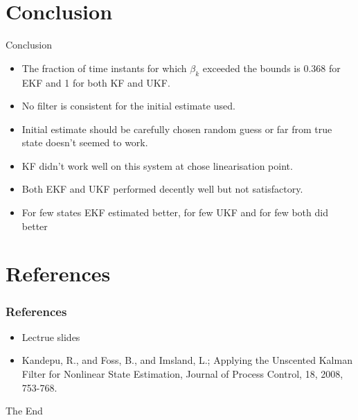 \documentclass{beamer}
\begin{document}
\section{Conclusion}
\begin{frame}{Conclusion}
    \begin{itemize}
        \item The fraction of time instants for which $\beta_k$ exceeded the bounds is 0.368 for EKF and 1 for both KF and UKF.
        \item No filter is consistent for the initial estimate used.
        \item Initial estimate should be carefully chosen random guess or far from true state doesn't seemed to work. 
        \item KF didn't work well on this system at chose linearisation point.
        \item Both EKF and UKF performed decently well but not satisfactory.
        \item For few states EKF estimated better, for few UKF and for few both did better
    \end{itemize}
\end{frame}
\section{References}
\begin{frame}
\frametitle{References}
\begin{itemize}
    \item Lectrue slides
    \item Kandepu, R., and Foss, B., and Imsland, L.; Applying the Unscented Kalman Filter
for Nonlinear State Estimation, Journal of Process Control, 18, 2008, 753-768.
\end{itemize}
\end{frame}


\begin{frame}
\Huge{\centerline{The End}}
\end{frame}
\end{document}
